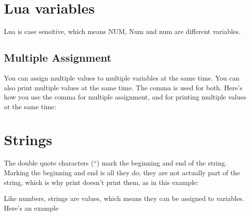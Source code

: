 \documentclass{tufte-book}
\begin{document}
\section{Lua variables}

\begin{tcblisting}{}
\end{tcblisting}

Lua is case sensitive, which means NUM, Num and num are different variables.

\begin{tcblisting}{}
\end{tcblisting}

\subsection{Multiple Assignment}
You can assign multiple values to multiple variables at the same time. You can also print multiple values
at the same time. The comma is used for both. Here’s how you use the comma for multiple assignment,
and for printing multiple values at the same time:

\begin{tcblisting}{}
\end{tcblisting}



\section{Strings}
The double quote characters (“) mark the beginning and end of the string. Marking the beginning and
end is all they do; they are not actually part of the string, which is why print doesn’t print them, as in
this example:

\begin{tcblisting}{}
\end{tcblisting}

Like numbers, strings are values, which means they can be assigned to variables. Here's an example
\begin{tcblisting}{}
\end{tcblisting}
\end{document}
